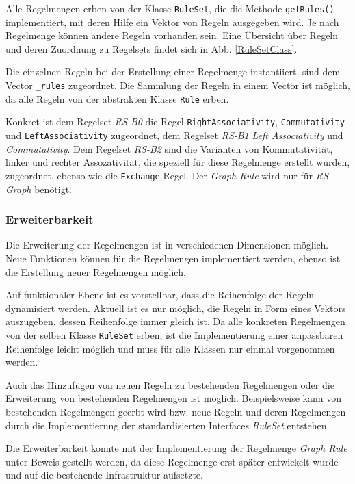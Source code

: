 Alle Regelmengen erben von der Klasse \texttt{RuleSet}, die die Methode \texttt{getRules()} implementiert, mit deren Hilfe ein Vektor von Regeln ausgegeben wird. Je nach Regelmenge können andere Regeln vorhanden sein. Eine Übersicht über Regeln und deren Zuordnung zu Regelsets findet sich in Abb. \ref{RuleSetClass}.

Die einzelnen Regeln bei der Erstellung einer Regelmenge instantiiert, sind dem Vector \texttt{\_rules} zugeordnet. Die Sammlung der Regeln in einem Vector ist möglich, da alle Regeln von der abstrakten Klasse \texttt{Rule} erben. 

Konkret ist dem Regelset \textit{RS-B0} die Regel \texttt{RightAssociativity}, \texttt{Commutativity} und \texttt{LeftAssociativity} zugeordnet, dem Regelset \textit{RS-B1} \textit{Left Associativity} und \textit{Commutativity}. Dem Regelset \textit{RS-B2} sind die Varianten von Kommutativität, linker und rechter Assozativität, die speziell für diese Regelmenge erstellt wurden, zugeordnet, ebenso wie die \texttt{Exchange} Regel. Der \textit{Graph Rule} wird nur für \textit{RS-Graph} benötigt.

\subsubsection{Erweiterbarkeit}
Die Erweiterung der Regelmengen ist in verschiedenen Dimensionen möglich. Neue Funktionen können für die Regelmengen implementiert werden, ebenso ist die Erstellung neuer Regelmengen möglich.

Auf funktionaler Ebene ist es vorstellbar, dass die Reihenfolge der Regeln dynamisiert werden. Aktuell ist es nur möglich, die Regeln in Form eines Vektors auszugeben, dessen Reihenfolge immer gleich ist. Da alle konkreten Regelmengen von der selben Klasse \texttt{RuleSet} erben, ist die Implementierung einer anpassbaren Reihenfolge leicht möglich und muss für alle Klassen nur einmal vorgenommen werden.


Auch das Hinzufügen von neuen Regeln zu bestehenden Regelmengen oder die Erweiterung von bestehenden Regelmengen ist möglich. Beispielsweise kann von bestehenden Regelmengen geerbt wird bzw. neue Regeln und deren Regelmengen durch die Implementierung der standardisierten Interfaces \textit{RuleSet} entstehen.

Die Erweiterbarkeit konnte mit der Implementierung der Regelmenge  \textit{Graph Rule} unter Beweis gestellt werden, da diese Regelmenge erst später entwickelt wurde und auf die bestehende Infrastruktur aufsetzte.




